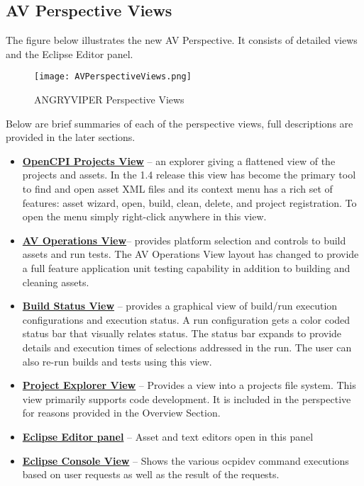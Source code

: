 \documentclass[10pt, a4paper, oneside]{article}
\begin{document}
\subsection{AV Perspective Views}
The figure below illustrates the new AV Perspective. It consists of detailed views and the Eclipse Editor panel.

\begin{figure}[h!]
	\centering
	\caption{ANGRYVIPER Perspective Views}\label{fig:AVPerspectiveViews}
	\texttt{[image: AVPerspectiveViews.png]}
\end{figure}

Below are brief summaries of each of the perspective views, full descriptions are provided in the later sections.
\begin{itemize}
\item []	\hyperlink{OpenCPI Projects View Features}{\textbf{OpenCPI Projects View}} – an explorer giving a flattened view of the projects and assets. In the 1.4 release this view has become the primary tool to find and open asset XML files and its context menu has a rich set of features: asset wizard, open, build, clean, delete, and project registration. To open the menu simply right-click anywhere in this view.
\item [] \hyperlink{Operations View }{\textbf{AV Operations View}}– provides platform selection and controls to build assets and run tests. The AV Operations View layout has changed to provide a full feature application unit testing capability in addition to building and cleaning assets.
\item []	\hyperlink{Build Status View Features}{\textbf{Build Status View}} – provides a graphical view of build/run execution configurations and execution status. A run configuration gets a color coded status bar that visually relates status. The status bar expands to provide details and execution times of selections addressed in the run. The user can also re-run builds and tests using this view.
\item [] \hyperlink{Project Explorer View}{\textbf{Project Explorer View}} – Provides a view into a projects file system. This view primarily supports code development. It is included in the perspective for reasons provided in the Overview Section.
\item [] \hyperlink{Editor panel} {\textbf{Eclipse Editor panel}} – Asset and text editors open in this panel
\item [] \hyperlink{Eclipse Console View} {\textbf{Eclipse Console View}} – Shows the various ocpidev command executions based on user requests as well as the result of the requests.
\end{itemize}
\end{document}
